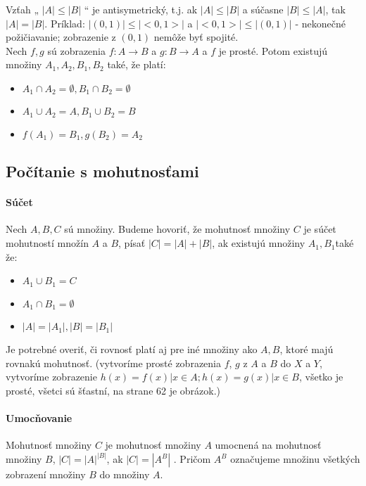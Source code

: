 	Vzťah „ $|A| \leq |B|$ “ je antisymetrický, t.j. ak $|A| \leq |B|$ a súčasne $|B| \leq |A|$, tak $|A| = |B|$. Príklad: $|(0, 1)| \leq |<0,1>|$ a $|<0,1>| \leq |(0,1)|$ - nekonečné požičiavanie; zobrazenie z $(0,1)$ nemôže byť spojité.\\


	Nech $f , g$ sú zobrazenia $f : A \rightarrow B$ a $g : B \rightarrow A$ a $f$ je prosté. Potom existujú množiny $A_{1}, A_{2}, B_{1}, B_{2}$ také, že platí:
	\begin{itemize}
		\item $A_{1} \cap A_{2} = \emptyset, B_{1} \cap B_{2} = \emptyset$
		\item $A_{1} \cup A_{2} = A, B_{1} \cup B_{2} = B$
		\item $f(A_{1}) = B_{1} , g(B_{2}) = A_{2}$
		\end{itemize}

   \subsection{Počítanie s mohutnosťami} 
   \paragraph{Súčet} 
   Nech $A, B, C$ sú množiny. Budeme hovoriť, že mohutnosť množiny $C$ je súčet mohutností množín $A$ a $B$, písať $|C| = |A| + |B|$, ak existujú množiny $A_{1} , B_{1} $také že:
   \begin{itemize}
	   \item $A_{1} \cup B_{1} = C$
	   \item $A_{1} \cap B_{1} = \emptyset $
	   \item $|A| = |A_{1}|, |B| = |B_{1}| $
   \end{itemize}
   Je potrebné overiť, či rovnosť platí aj pre iné množiny ako $A, B$, ktoré majú rovnakú mohutnosť. (vytvoríme prosté zobrazenia $f$, $g$ z $A$ a $B$ do $X$ a $Y$, vytvoríme zobrazenie $h(x) = f(x) | x \in A; h(x) = g(x) | x \in B$, všetko je prosté, všetci sú šťastní, na strane 62 je obrázok.)

   \paragraph{Umocňovanie}
   Mohutnosť množiny $C$ je mohutnosť množiny $A$ umocnená na mohutnosť množiny $B$, 
   $|C| = |A|^{|B|}$, ak $|C| = |A^{B}|$ . Pričom $A^{B}$ označujeme množinu všetkých zobrazení množiny $B$ do množiny $A$.

